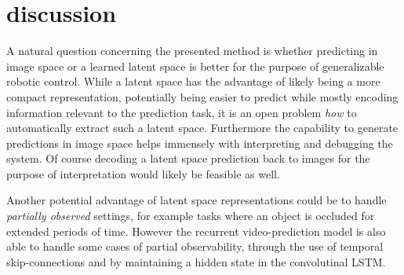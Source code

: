 \section{discussion}
A natural question concerning the presented method is whether predicting in image space or a learned latent space is better for the purpose of generalizable robotic control. While a latent space has the advantage of likely being a more compact representation, potentially being easier to predict while mostly encoding information relevant to the prediction task, it is an open problem \emph{how} to automatically extract such a latent space. Furthermore the capability to generate predictions in image space helps immensely with interpreting and debugging the system. Of course decoding a latent space prediction back to images for the purpose of interpretation would likely be feasible as well. 

Another potential advantage of latent space representations could be to handle \emph{partially observed} settings, for example tasks where an object is occluded for extended periods of time. However the recurrent video-prediction model is also able to handle some cases of partial observability, through the use of temporal skip-connections and by maintaining a hidden state in the convolutinal LSTM.